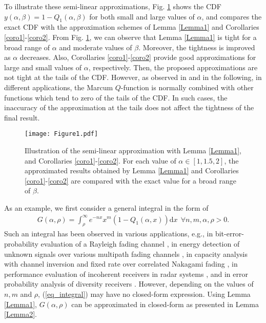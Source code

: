 To illustrate these semi-linear approximations, Fig. \ref{fig_CDFilu} shows the CDF $y(\alpha,\beta)= 1-Q_1(\alpha,\beta)$ for both small and large values of $\alpha$, and compares the exact CDF with the approximation schemes of Lemma \ref{Lemma1} and Corollaries \ref{coro1}-\ref{coro2}. From Fig. \ref{fig_CDFilu}, we can observe that Lemma \ref{Lemma1} is tight for a broad range of $\alpha$  and moderate values of $\beta$. Moreover, the tightness is improved as $\alpha$ decreases. Also,  Corollaries \ref{coro1}-\ref{coro2} provide good approximations for large and small values of $\alpha$, respectively. Then, the proposed approximations are not tight at the tails of the CDF. However, as observed in \cite{Bocus2013CLapproximation,Fu2011GLOBECOMexponential,Makki2013TCfeedback,Makki2011Eurasipcapacity,Makki2018WCLwireless,Makki2016TVTperformance,Simon2003TWCsome,Suraweera2010TVTcapacity,Ma2000JSACunified,Digham2007TCenergy,Cao2016CLsolutions,sofotasios2015solutions,Azari2018TCultra,Alam2014INFOCOMWrobust,Gao2018IAadmm,Shen2018TVToutage,Song2017JLTimpact,Tang2019IAan}  and in the following, in different applications,  the Marcum $Q$-function is normally combined with other functions which tend to zero of the tails of the CDF. In such cases, the inaccuracy of the approximation at the tails does not affect the tightness of the final result. 





\begin{figure}
\centering
  \texttt{[image: Figure1.pdf]}\\
\caption{Illustration of the semi-linear approximation with Lemma \ref{Lemma1}, and Corollaries \ref{coro1}-\ref{coro2}. For each value of $\alpha\in[1,1.5,2]$, the approximated results obtained by Lemma \ref{Lemma1} and Corollaries \ref{coro1}-\ref{coro2} are compared with the exact value for a broad range of $\beta$.}
\label{fig_CDFilu}
\end{figure}








As an example, we first consider a general integral in the form of
\begin{align}\label{eq_integral}
G(\alpha,\rho)=\int_\rho^\infty{e^{-nx} x^m \left(1-Q_1(\alpha,x)\right)\text{d}x} ~~\forall n,m,\alpha,\rho>0.
\end{align}
Such an integral has been observed in various applications, e.g., in bit-error-probability evaluation of a Rayleigh fading channel \cite[eq. (1) (13)]{Simon2003TWCsome}, in energy detection of unknown signals over various multipath fading channels \cite[eq. (2)]{Cao2016CLsolutions}, in capacity analysis with channel inversion and fixed rate over correlated Nakagami fading \cite[eq. (1)]{sofotasios2015solutions}, in performance evaluation of  incoherent receivers in radar systems \cite[eq. (3)]{Cui2012ELtwo}, and in error probability analysis of diversity receivers \cite[eq. (1)]{Gaur2003TVTsome}. However, depending on the values of $n, m$ and $\rho$, (\ref{eq_integral}) may have no closed-form expression. Using Lemma \ref{Lemma1}, $G(\alpha,\rho)$ can be approximated in closed-form as presented in Lemma \ref{Lemma2}.

